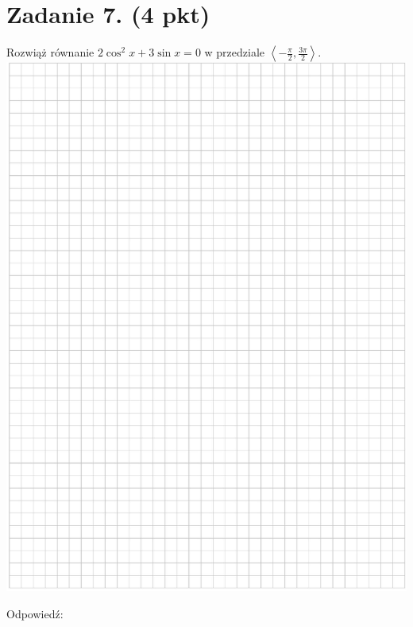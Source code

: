\documentclass[10pt]{article}
\begin{document}
\section*{Zadanie 7. (4 pkt)}
Rozwiąż równanie \(2 \cos ^{2} x+3 \sin x=0\) w przedziale \(\left\langle-\frac{\pi}{2}, \frac{3 \pi}{2}\right\rangle\).\\
\includegraphics[max width=\textwidth, center]{2024_11_21_7379bf55d75dd0fc4c58g-12}

Odpowiedź: \(\qquad\)
\end{document}
